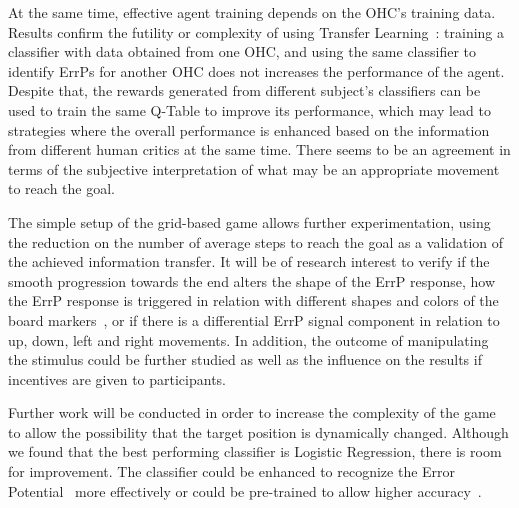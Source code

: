 \documentclass[journal]{IEEEtran}
\begin{document}
{{%

At the same time, effective agent training depends on the OHC's training data. Results confirm the futility or complexity of using Transfer Learning~\cite{Wu2016}: training a classifier with data obtained from one OHC, and using the same classifier to identify ErrPs for another OHC does not increases the performance of the agent.  Despite that, the rewards generated from different subject's classifiers can be used to train the same Q-Table to improve its performance, which may lead to strategies where the overall performance is enhanced based on the information from different human critics at the same time.  There seems to be an agreement in terms of the subjective interpretation of what may be an appropriate movement to reach the goal.

The simple setup of the grid-based game allows further experimentation, using the reduction on the number of average steps to reach the goal as a validation of the achieved information transfer.  It will be of research interest to verify if the smooth progression towards the end alters the shape of the ErrP response, how the ErrP response is triggered in relation with different shapes and colors of the board markers~\cite{EIMER1997143}, or if there is a differential ErrP signal component in relation to up, down, left and right movements.  In addition, the outcome of manipulating the stimulus could be further studied as well as the influence on the results if incentives are given to participants.

Further work will be conducted in order to increase the complexity of the game to allow the possibility that the target position is dynamically changed.  Although we found that the best performing classifier is Logistic Regression, there is room for improvement.  The classifier could be enhanced to recognize the Error Potential~\cite{Iwane2017} more effectively or could be pre-trained to allow higher accuracy~\cite{Spuler2012}.

}}
\end{document}
